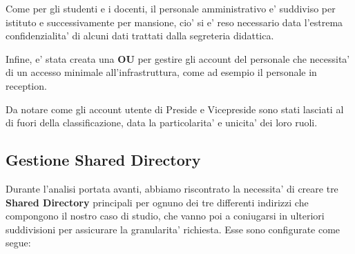 \documentclass{report}
\begin{document}
            Come per gli studenti e i docenti, il personale amministrativo e' suddiviso per istituto e successivamente
             per mansione, cio' si e' reso necessario data l'estrema confidenzialita' di alcuni dati trattati dalla
             segreteria didattica.

            Infine, e' stata creata una \textbf{OU} per gestire gli account del personale che necessita' di un
             accesso minimale all'infrastruttura, come ad esempio il personale in reception.

            Da notare come gli account utente di Preside e Vicepreside sono stati lasciati al di fuori della
             classificazione, data la particolarita' e unicita' dei loro ruoli.
            \subsection{Gestione Shared Directory}
            Durante l'analisi portata avanti, abbiamo riscontrato la necessita' di creare tre \textbf{Shared 
             Directory} principali per ognuno dei tre differenti indirizzi che compongono il nostro caso
             di studio, che vanno poi a coniugarsi in ulteriori suddivisioni per assicurare la granularita'
             richiesta. Esse sono configurate come segue:
\end{document}
